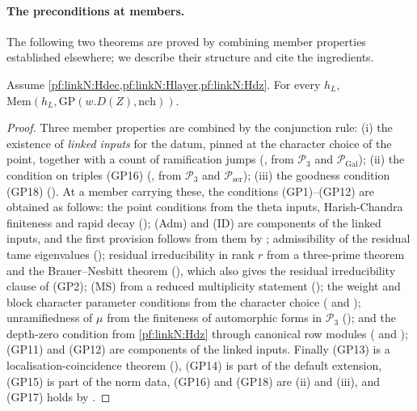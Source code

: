 \paragraph{The preconditions at members.}
The following two theorems are proved by combining member properties established elsewhere; we describe their structure and cite
the ingredients.

\begin{theorem}\label{pf:linkN:GPmem}
Assume \cref{pf:linkN:Hdec,pf:linkN:Hlayer,pf:linkN:Hdz}. For every $h_L$, $\mathrm{Mem}(h_L,\mathrm{GP}(w.D(Z),\mathrm{nch}))$.
\end{theorem}

\begin{proof}
Three member properties are combined by the conjunction rule:
(i) the existence of \emph{linked inputs} for the datum, pinned at the character choice of the point, together with a count of
ramification jumps (, from $\mathcal P_3$ and
$\mathcal P_{\mathrm{Gal}}$); (ii) the condition on triples (GP16) (,
from $\mathcal P_3$ and $\mathcal P_{\mathrm{ser}}$); (iii) the goodness condition (GP18)
(). At a member carrying these, the conditions (GP1)--(GP12) are obtained as
follows: the point conditions from the theta inputs, Harish-Chandra finiteness and rapid decay
(); (Adm) and (ID) are components of the linked inputs, and the
first provision follows from them by ; admissibility of the residual tame eigenvalues
(); residual irreducibility in rank $r$ from a three-prime theorem and the
Brauer--Nesbitt theorem \cite{CurtisReiner1962}
(), which also gives the
residual irreducibility clause of (GP2); (MS) from a reduced multiplicity statement
(); the weight and block character parameter conditions from the character
choice ( and ); unramifiedness of $\mu$
from the finiteness of automorphic forms in $\mathcal P_3$ (); and the depth-zero
condition from \cref{pf:linkN:Hdz} through canonical row modules
( and ); (GP11) and (GP12) are components of the
linked inputs. Finally (GP13) is a localisation-coincidence theorem (), (GP14) is
part of the default extension, (GP15) is part of the norm data, (GP16) and (GP18) are (ii) and (iii), and (GP17) holds by
.
\end{proof}


